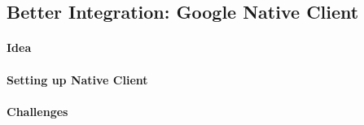 \begin{appendices}



\section{Better Integration: Google Native Client}

\paragraph{Idea}

\paragraph{Setting up Native Client}

\paragraph{Challenges}

\end{appendices}